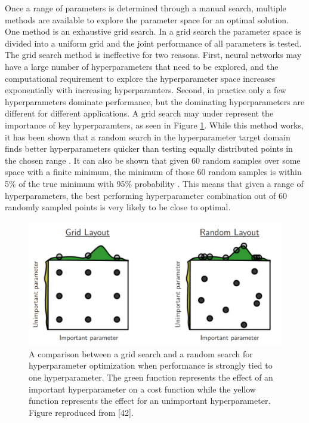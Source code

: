 Once a range of parameters is determined through a manual search, multiple methods are available to explore the parameter space for an optimal solution. One method is an exhaustive grid search. In a grid search the parameter space is divided into a uniform grid and the joint performance of all parameters is tested. The grid search method is ineffective for two reasons. First, neural networks may have a large number of hyperparameters that need to be explored, and the computational requirement to explore the hyperparameter space increases exponentially with increasing hyperparamters. Second, in practice only a few hyperparameters dominate performance, but the dominating hyperparameters are different for different applications. A grid search may under represent the importance of key hyperparamters, as seen in Figure \ref{fig:Bergstra12a_hyperparameter_grid_vs_random}.  While this method works, it has been shown that a random search in the hyperparameter target domain finds better hyperparameters quicker than testing equally distributed points in the chosen range \cite{Bergstra2012}. It can also be shown that given 60 random samples over some space with a finite minimum, the minimum of those 60 random samples is within 5\% of the true minimum with 95\% probability \cite{Zheng2015}. This means that given a range of hyperparameters, the best performing hyperparameter combination out of 60 randomly sampled points is very likely to be close to optimal. 

\begin{figure}[H]
	\centering
	\includegraphics[width=0.99\linewidth]{images/Bergstra12a_hyperparameter_grid_vs_random}
	\caption{A comparison between a grid search and a random search for hyperparameter optimization when performance is strongly tied to one hyperparameter. The green function represents the effect of an important hyperparameter on a cost function while the yellow function represents the effect for an unimportant hyperparameter. Figure reproduced from [42].}
	\label{fig:Bergstra12a_hyperparameter_grid_vs_random}
\end{figure}


